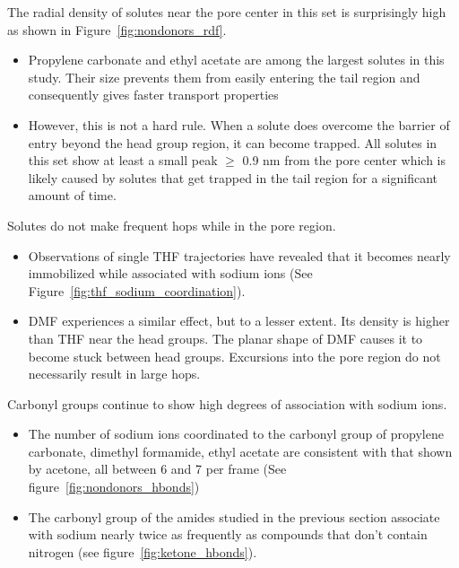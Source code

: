 \documentclass{article}
\begin{document}
  \noindent The radial density of solutes near the pore center in this set is 
  surprisingly high as shown in Figure~\ref{fig:nondonors_rdf}.
  \begin{itemize}
    \item Propylene carbonate and ethyl acetate are among the largest solutes
    in this study. Their size prevents them from easily entering the tail 
    region and consequently gives faster transport properties 
    \item However, this is not a hard rule. When a solute does overcome the 
    barrier of entry beyond the head group region, it can become trapped. All
    solutes in this set show at least a small peak $\geq$ 0.9 nm from the pore 
    center which is likely caused by solutes that get trapped in the tail region
    for a significant amount of time.
  \end{itemize}
    
  \noindent Solutes do not make frequent hops while in the pore region.
  \begin{itemize}
	\item Observations of single THF trajectories have revealed that it becomes 
	nearly immobilized while associated with sodium ions 
	(See Figure~\ref{fig:thf_sodium_coordination}).
	\item DMF experiences a similar effect, but to a lesser extent. Its density is 
	higher than THF near the head groups. The planar shape of DMF causes it to 
	become stuck between head groups. Excursions into the pore region do not
	necessarily result in large hops.
  \end{itemize}
  
  \noindent Carbonyl groups continue to show high degrees of association with
  sodium ions. 
  \begin{itemize}
    \item The number of sodium ions coordinated to the carbonyl group of 
    propylene carbonate, dimethyl formamide, ethyl acetate are consistent with 
    that shown by acetone, all between 6 and 7 per frame (See 
    figure~\ref{fig:nondonors_hbonds})
    \item The carbonyl group of the amides studied in the previous section
    associate with sodium nearly twice as frequently as compounds that don't
    contain nitrogen (see figure~\ref{fig:ketone_hbonds}).
  \end{itemize}
 
\end{document}
